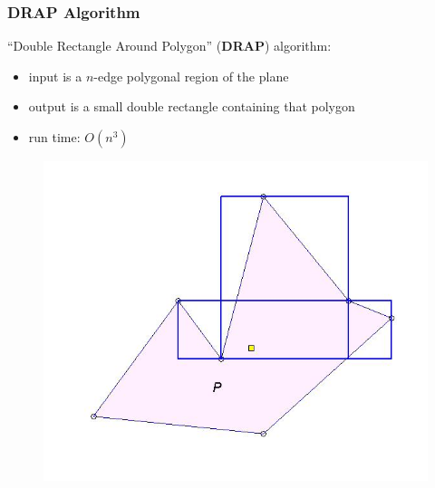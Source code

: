 \documentclass[compress]{beamer}
\begin{document}
\begin{frame} \frametitle{DRAP Algorithm}
``Double Rectangle Around Polygon'' (\textbf{DRAP}) algorithm:\\
\begin{itemize}
     \item input is a $n$-edge polygonal region of the plane
    \item output is a small double rectangle containing that polygon
    \item run time: $O(n^3)$
\end{itemize}

    \begin{figure}
    \includegraphics[scale=0.3]{drap4.jpg}
    \end{figure}


\transboxout
\end{frame}
\end{document}
